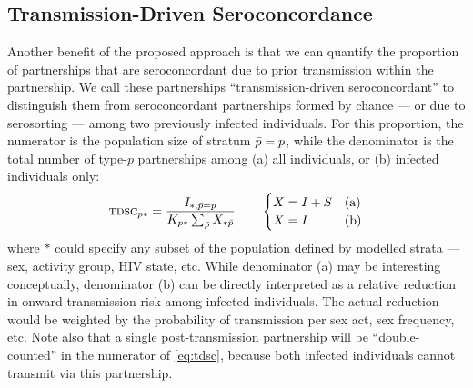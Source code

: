 \subsection{Transmission-Driven Seroconcordance}\label{foi.prop.tdsc}
Another benefit of the proposed approach is that
we can quantify the proportion of partnerships that are seroconcordant
due to prior transmission within the partnership.
We call these partnerships ``transmission-driven seroconcordant''
to distinguish them from seroconcordant partnerships formed by chance
--- or due to serosorting \cite{Purcell2017,Kim2020} ---
among two previously infected individuals.
For this proportion,
the numerator is the population size of stratum $\bar{p}=p$, while
the denominator is the total number of type-$p$ partnerships among
(a) all individuals, or (b) infected individuals only:
\begin{equation}\label{eq:tdsc}
  \textsc{tdsc}_{p*} = \frac{I_{*,\bar{p}=p}}{K_{p*} \sum_{\bar{p}} X_{*\bar{p}}}
  \qquad
  \begin{cases}
    X = I + S & \textnormal{(a)} \\
    X = I     & \textnormal{(b)} \\
  \end{cases}
\end{equation}
where $*$ could specify any subset of the population
defined by modelled strata --- \eg sex, activity group, HIV state, etc.
While denominator (a) may be interesting conceptually,
denominator (b) can be directly interpreted as
a relative reduction in onward transmission risk among infected individuals.
The actual reduction would be weighted by
the probability of transmission per sex act, sex frequency, etc.
Note also that a single post-transmission partnership
will be ``double-counted'' in the numerator of \eqref{eq:tdsc},
because both infected individuals cannot transmit via this partnership.
